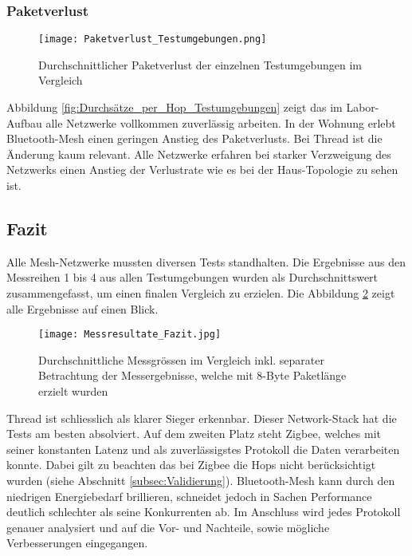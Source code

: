 \subsubsection{Paketverlust}\label{subsec:VergleichPaketverlustTestumgebungen}


\begin{figure}[H]
	\centering
	\texttt{[image: Paketverlust\_Testumgebungen.png]}
	\caption{Durchschnittlicher Paketverlust der einzelnen Testumgebungen im Vergleich}\label{fig:PaketverlusteTestumgebungen}
\end{figure}

Abbildung \ref{fig:Durchsätze_per_Hop_Testumgebungen} zeigt das im Labor-Aufbau alle Netzwerke vollkommen zuverlässig arbeiten. In der Wohnung erlebt Bluetooth-Mesh einen geringen Anstieg des Paketverlusts. Bei Thread ist die Änderung kaum relevant. Alle Netzwerke erfahren bei starker Verzweigung des Netzwerks einen Anstieg der Verlustrate wie es bei der Haus-Topologie zu sehen ist. 


\subsection{Fazit}\label{subsec:FazitVergleich}
Alle Mesh-Netzwerke mussten diversen Tests standhalten. Die Ergebnisse aus den Messreihen 1 bis 4 aus allen Testumgebungen wurden als Durchschnittswert zusammengefasst, um einen finalen Vergleich zu erzielen. Die Abbildung \ref{fig:Messresultate_Fazit} zeigt alle Ergebnisse auf einen Blick.

\begin{figure}[H]
	\centering
	\texttt{[image: Messresultate\_Fazit.jpg]}
	\caption{Durchschnittliche Messgrössen im Vergleich inkl. separater Betrachtung der Messergebnisse, welche mit 8-Byte Paketlänge erzielt wurden}\label{fig:Messresultate_Fazit}
\end{figure}

Thread ist schliesslich als klarer Sieger erkennbar. Dieser Network-Stack hat die Tests am besten absolviert. Auf dem zweiten Platz steht Zigbee, welches mit seiner konstanten Latenz und als zuverlässigstes Protokoll die Daten verarbeiten konnte. Dabei gilt zu beachten das bei Zigbee die Hops nicht berücksichtigt wurden (siehe Abschnitt \ref{subsec:Validierung}). Bluetooth-Mesh kann durch den niedrigen Energiebedarf brillieren, schneidet jedoch in Sachen Performance deutlich schlechter als seine Konkurrenten ab. Im Anschluss wird jedes Protokoll genauer analysiert und auf die Vor- und Nachteile, sowie mögliche Verbesserungen eingegangen. 


